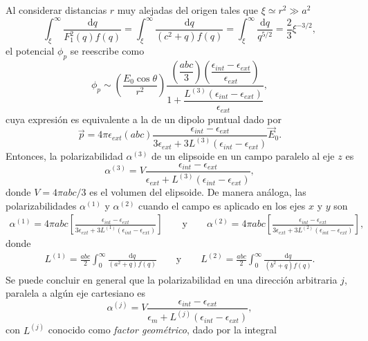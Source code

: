 Al considerar distancias $r$ muy alejadas del origen tales que $\xi\simeq r^2\gg a^2$
\begin{equation*}
    \int_{\xi}^{\infty}\frac{\text{d}q}{F_1^2(q)f(q)}= \int_{\xi}^{\infty}\frac{\text{d}q}{(c^2+q)f(q)}=\int_{\xi}^{\infty}\frac{\text{d}q}{q^{5/2}}=\frac{2}{3}\xi^{-3/2},
\end{equation*}
el potencial $\phi_p$ se reescribe como
\begin{equation}
    \phi_p\sim\left(\dfrac{E_0\cos\theta}{r^2}\right)\dfrac{\left(\dfrac{abc}{3}\right)\left(\dfrac{\epsilon_{int}-\epsilon_{ext}}{\epsilon_{ext}}\right)}{1+\dfrac{L^{(3)}(\epsilon_{int}-\epsilon_{ext})}{\epsilon_{ext}}},
\end{equation}
cuya expresión es equivalente a la de un dipolo puntual dado por
\begin{equation}
    \Vec{p}=4\pi\epsilon_{ext} (abc)\frac{\epsilon_{int}-\epsilon_{ext}}{3\epsilon_{ext}+3L^{(3)}(\epsilon_{int}-\epsilon_{ext})}\Vec{E}_0
    \label{momento_dip}.
\end{equation}
Entonces, la polarizabilidad $\alpha^{(3)}$ de un elipsoide en un campo paralelo al eje $z$ es
\begin{equation}
    \alpha^{(3)}=V\frac{\epsilon_{int}-\epsilon_{ext}}{\epsilon_{ext}+L^{(3)}(\epsilon_{int}-\epsilon_{ext})},
\end{equation}
donde $V=4\pi abc/3$ es el volumen del elipsoide. De manera análoga, las polarizabilidades $ \alpha^{(1)}$ y $ \alpha^{(2)}$ cuando el campo es aplicado en los ejes $x$ y $y$ son
\begin{align*}
    \alpha^{(1)}=4\pi abc\left[ \frac{\epsilon_{int}-\epsilon_{ext}}{3\epsilon_{ext}+3L^{(1)}(\epsilon_{int}-\epsilon_{ext})}\right]\qquad\text{y}\qquad
    \alpha^{(2)}=4\pi abc\left[ \frac{\epsilon_{int}-\epsilon_{ext}}{3\epsilon_{ext}+3L^{(2)}(\epsilon_{int}-\epsilon_{ext})}\right],
\end{align*}
donde 
\begin{align*}
    L^{(1)}=\frac{abc}{2}\int_{0}^{\infty}\frac{\text{d}q}{(a^2+q)f(q)}\qquad\text{y}\qquad
    L^{(2)}=\frac{abc}{2}\int_{0}^{\infty}\frac{\text{d}q}{(b^2+q)f(q)}.
\end{align*}
Se puede concluir en general que la polarizabilidad en una dirección arbitraria $j$, paralela a algún eje cartesiano es
\begin{equation}
    \alpha^{(j)}=V\frac{\epsilon_{int}-\epsilon_{ext}}{\epsilon_m+L^{(j)}(\epsilon_{int}-\epsilon_{ext})},
\end{equation}
con $L^{(j)}$ conocido como \textit{factor geométrico}, dado por la integral 
